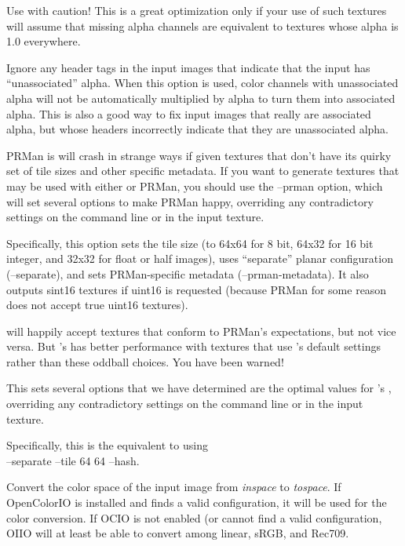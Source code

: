 Use with caution!  This is a great optimization only if your use of such
textures will assume that missing alpha channels are equivalent to
textures whose alpha is 1.0 everywhere.
\apiend

\NEW Ignore any header tags in the input images that indicate that the
input has ``unassociated'' alpha.  When this option is used, color
channels with unassociated alpha will not be automatically multiplied
by alpha to turn them into associated alpha. This is also a good way
to fix input images that really are associated alpha, but whose headers
incorrectly indicate that they are unassociated alpha. 
\apiend

PRMan is will crash in strange ways if given textures that don't have
its quirky set of tile sizes and other specific metadata.  If you want
\maketx to generate textures that may be used with either \OpenImageIO
or PRMan, you should use the {\cf --prman} option, which will set
several options to make PRMan happy, overriding any contradictory
settings on the command line or in the input texture.  

Specifically, this option sets the tile size (to 64x64 for 8 bit,
64x32 for 16 bit integer, and 32x32 for float or {\cf half} images),
uses ``separate'' planar configuration ({\cf --separate}), and sets
PRMan-specific metadata ({\cf --prman-metadata}).  It also outputs 
sint16 textures if uint16 is requested (because PRMan for some reason
does not accept true uint16 textures).

\OpenImageIO will happily accept textures that conform to PRMan's
expectations, but not vice versa.  But \OpenImageIO's \TextureSystem
has better performance with textures that use \maketx's default settings
rather than these oddball choices.  You have been warned!
\apiend

This sets several options that we have determined are the 
optimal values for \OpenImageIO's \TextureSystem, overriding any
contradictory settings on the command line or in the input texture.

Specifically, this is the equivalent to using \\
 {\cf --separate --tile 64 64 --hash}.
\apiend

Convert the color space of the input image from \emph{inspace} to
\emph{tospace}.  If OpenColorIO is installed and finds a valid
configuration, it will be used for the color conversion.  If OCIO
is not enabled (or cannot find a valid configuration, OIIO will at
least be able to convert among linear, sRGB, and Rec709.
\apiend

